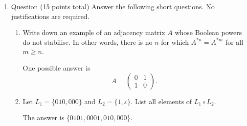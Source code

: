 \documentclass{amsart}
\begin{document}
\begin{enumerate}
\begin{enumerate}
\item An NFA must have at least one accept state.
\begin{solution}
False.
\end{solution}

\item The game graph of the game state of an impartial combinatorial game has no directed loops.
\begin{solution}
True.
\end{solution}

\item If a game has Grundy label \(6\), then it is equivalent to a nim game whose state is \(4,3,1\).
\begin{solution}
True (the nim sum of the second nim game is \(100_2 + 11_2 + 1_2 = 110_2 = 6\)).
\end{solution}

\item In an impartial combinatorial game \(G\), it may be possible to move directly from a \(P\) position to another \(P\) position.
\begin{solution}
False (a \(P\) position is one that only maps to \(N\) positions).
\end{solution}
\end{enumerate}
\item Question (15 points total)
\label{sec:orge795eaf}
Answer the following short questions. No justifications are required.
\begin{enumerate}
\item Write down an example of an adjacency matrix \(A\) whose Boolean powers do not stabilise.
In other words, there is no \(n\) for which \(A^{\ast n} = A^{\ast m}\) for all \(m \geq n\).
\begin{solution}
One possible answer is
\[A = \begin{pmatrix}0 & 1\\1 & 0\end{pmatrix}.\]
\end{solution}

\item Let \(L_1 = \{010, 000\}\) and \(L_2 = \{1,\varepsilon\}\). List all elements of \(L_1 \circ L_2\).
\begin{solution}
The answer is \(\{0101, 0001, 010, 000\}\).
\end{solution}


\end{enumerate}
\end{enumerate}
\end{document}
